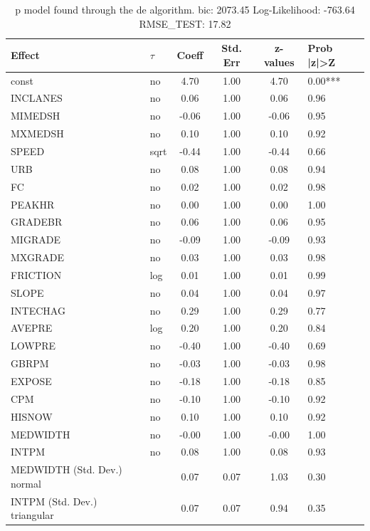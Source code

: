 \begin{table}
	\caption{p model found through the de algorithm. bic: 2073.45 Log-Likelihood: -763.64 RMSE_TEST: 17.82}
	\begin{center}
		\begin{tabular}{|l|l|c|c|c|l|}
			\hline
			Effect & $\tau$ & Coeff & Std. Err & z-values & Prob |z|>Z \\
			\hline
			const & no & 4.70 & 1.00 & 4.70 & 0.00*** \\
			\hline
			INCLANES & no & 0.06 & 1.00 & 0.06 & 0.96 \\
			\hline
			MIMEDSH & no & -0.06 & 1.00 & -0.06 & 0.95 \\
			\hline
			MXMEDSH & no & 0.10 & 1.00 & 0.10 & 0.92 \\
			\hline
			SPEED & sqrt & -0.44 & 1.00 & -0.44 & 0.66 \\
			\hline
			URB & no & 0.08 & 1.00 & 0.08 & 0.94 \\
			\hline
			FC & no & 0.02 & 1.00 & 0.02 & 0.98 \\
			\hline
			PEAKHR & no & 0.00 & 1.00 & 0.00 & 1.00 \\
			\hline
			GRADEBR & no & 0.06 & 1.00 & 0.06 & 0.95 \\
			\hline
			MIGRADE & no & -0.09 & 1.00 & -0.09 & 0.93 \\
			\hline
			MXGRADE & no & 0.03 & 1.00 & 0.03 & 0.98 \\
			\hline
			FRICTION & log & 0.01 & 1.00 & 0.01 & 0.99 \\
			\hline
			SLOPE & no & 0.04 & 1.00 & 0.04 & 0.97 \\
			\hline
			INTECHAG & no & 0.29 & 1.00 & 0.29 & 0.77 \\
			\hline
			AVEPRE & log & 0.20 & 1.00 & 0.20 & 0.84 \\
			\hline
			LOWPRE & no & -0.40 & 1.00 & -0.40 & 0.69 \\
			\hline
			GBRPM & no & -0.03 & 1.00 & -0.03 & 0.98 \\
			\hline
			EXPOSE & no & -0.18 & 1.00 & -0.18 & 0.85 \\
			\hline
			CPM & no & -0.10 & 1.00 & -0.10 & 0.92 \\
			\hline
			HISNOW & no & 0.10 & 1.00 & 0.10 & 0.92 \\
			\hline
			MEDWIDTH & no & -0.00 & 1.00 & -0.00 & 1.00 \\
			\hline
			INTPM & no & 0.08 & 1.00 & 0.08 & 0.93 \\
			\hline
			MEDWIDTH (Std. Dev.) normal &  & 0.07 & 0.07 & 1.03 & 0.30 \\
			\hline
			INTPM (Std. Dev.) triangular &  & 0.07 & 0.07 & 0.94 & 0.35 \\
			\hline
		\end{tabular}
	\end{center}
\end{table}